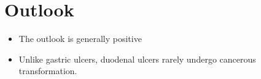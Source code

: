 \section{Outlook}
\begin{itemize}[noitemsep]
  \item The outlook is generally positive
  \item Unlike gastric ulcers, duodenal ulcers rarely undergo cancerous transformation.
\end{itemize}
